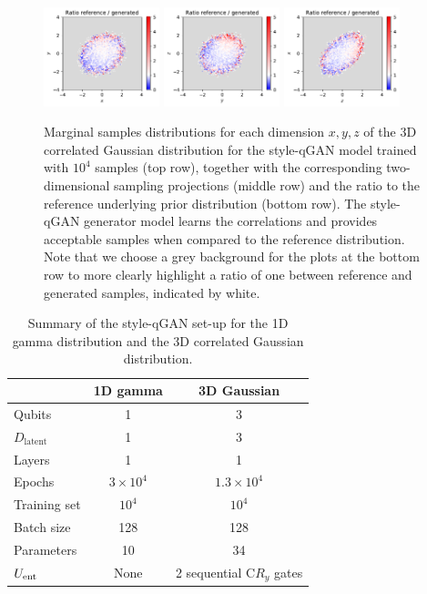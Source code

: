 \documentclass[twocolumn,preprintnumbers,superscriptaddress]{revtex4-2}
\begin{document}
\begin{figure}
  
   \includegraphics[width=0.3\textwidth]{plots/3Dgaussian_posdef/1-2_RATIO_100k.pdf}%
  \includegraphics[width=0.3\textwidth]{plots/3Dgaussian_posdef/2-3_RATIO_100k.pdf}%
  \includegraphics[width=0.3\textwidth]{plots/3Dgaussian_posdef/3-1_RATIO_100k.pdf}


  \caption{\label{fig:3dgauss}Marginal samples distributions for each dimension $x,y,z$
    of the 3D correlated Gaussian distribution for the style-qGAN model trained
    with $10^4$ samples (top row), together with the corresponding
    two-dimensional sampling projections (middle row) and the ratio to the reference underlying
    prior distribution (bottom row). The style-qGAN generator model learns the correlations and
    provides acceptable samples when compared to the reference distribution. Note that we choose
    a grey background for the plots at the bottom row to more clearly highlight a ratio of one between reference and generated samples, indicated by white.}
\end{figure}

\begin{table}
  \begin{tabular}{l|c|c}
     & {\bf 1D gamma} & {\bf 3D Gaussian} \tabularnewline
    \hline
    Qubits & 1 & 3 \tabularnewline
    $D_{\mathrm{latent}}$ & 1 & 3 \tabularnewline
    Layers & 1 & 1 \tabularnewline
    Epochs & $3\times10^4$ & $1.3\times10^4$ \tabularnewline
    Training set & $10^4$ & $10^4$ \tabularnewline
    Batch size & 128 & 128 \tabularnewline
    Parameters & 10 & 34 \tabularnewline
    $U_{\rm ent}$ & None & 2 sequential C$R_y$ gates \tabularnewline
    \hline
  \end{tabular}

  \caption{\label{table:summary} Summary of the style-qGAN set-up for the 1D
  gamma distribution and the 3D correlated Gaussian distribution.}
\end{table}
\end{document}
